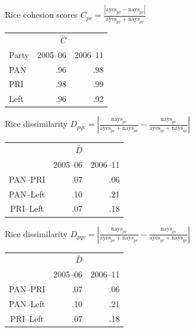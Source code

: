 \documentclass[bigger]{beamer}
\begin{document}
\begin{frame}[label={sec:org8d3b9b0}]{Rice cohesion scores}
\centering
\(C_{pv} = \frac{\left|\text{ayes}_{pv} - \text{nays}_{pv}\right|}{\text{ayes}_{pv} + \text{nays}_{pv}}\)
\bigskip
\begin{center}
\begin{tabular}{lrr}
 & \(\bar{C}\) & \\
Party & 2005--06 & 2006--11\\
\hline
PAN & .96 & .98\\
PRI & .98 & .99\\
Left & .96 & .92\\
\end{tabular}
\end{center}
\end{frame}
\begin{frame}[label={sec:orga090105}]{Rice dissimilarity}
\centering
\(D_{pqv} = \left|\frac{\text{nays}_{pv}}{\text{ayes}_{pv} + \text{nays}_{pv}} - \frac{\text{nays}_{qv}}{\text{ayes}_{qv} + \text{nays}_{qv}}\right|\)

\bigskip
\begin{center}
\begin{tabular}{crr}
 & \(\bar{D}\) & \\
 & 2005--06 & 2006--11\\
\hline
PAN--PRI & .07 & .06\\
PAN--Left & .10 & .21\\
PRI--Left & .07 & .18\\
\end{tabular}
\end{center}
\end{frame}
\begin{frame}[label={sec:orgabfc815}]{Rice dissimilarity}
\centering
\(D_{pqv} = \left|\frac{\text{nays}_{pv}}{\text{ayes}_{pv} + \text{nays}_{pv}} - \frac{\text{nays}_{qv}}{\text{ayes}_{qv} + \text{nays}_{qv}}\right|\)

\bigskip
\begin{center}
\begin{tabular}{crr}
 & \(\bar{D}\) & \\
 & 2005--06 & 2006--11\\
\hline
PAN--PRI & .07 & \alert{.06}\\
PAN--Left & .10 & \alert{.21}\\
PRI--Left & .07 & \alert{.18}\\
\end{tabular}
\end{center}
\end{frame}
\end{document}
